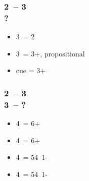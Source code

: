 \documentclass[12pt, a4paper]{report}
\begin{document}
{    \subsubsection*{2\ntx\ -- 3\hearts \\ ?}
    \begin{itemize}
        \item 3\spades\ = 2\spades
        \item 3\nt\ = 3+\spades, propositional
        \item cue = 3+\spades
    \end{itemize}

    \subsubsection*{2\ntx\ -- 3\spades \\ 3\nt\ -- ?}
    \begin{itemize}
        \item 4\clubs\ = 6+\clubs
        \item 4\diams\ = 6+\diams
        \item 4\hearts\ = 54\minor\ 1-\hearts
        \item 4\spades\ = 54\minor\ 1-\spades
    \end{itemize}
}
\end{document}
